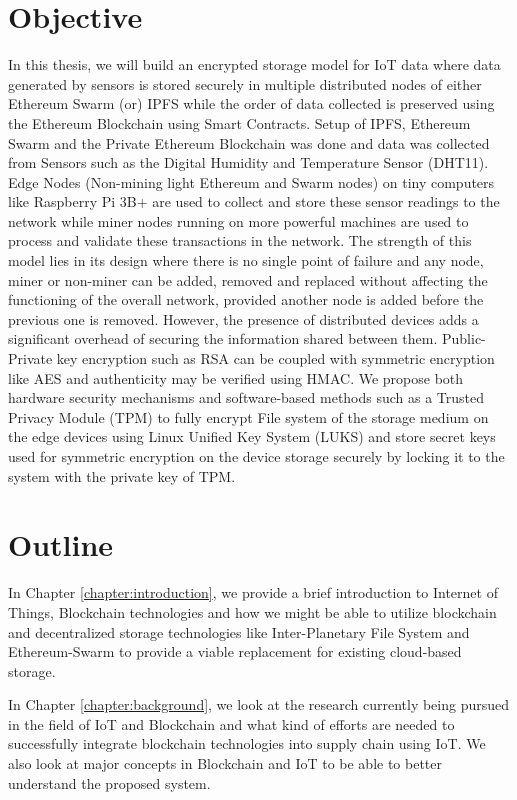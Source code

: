 \documentclass[11pt,openright]{report}
\begin{document}
\section{Objective}\label{section:objective}
In this thesis, we will build an encrypted storage model for IoT data where data generated by sensors is stored securely in multiple distributed nodes of either Ethereum Swarm (or) IPFS while the order of data collected is preserved using the Ethereum Blockchain using Smart Contracts. Setup of IPFS, Ethereum Swarm and the Private Ethereum Blockchain was done and data was collected from Sensors such as the Digital Humidity and Temperature Sensor (DHT11). Edge Nodes (Non-mining light Ethereum and Swarm nodes) on tiny computers like Raspberry Pi 3B+ are used to collect and store these sensor readings to the network while miner nodes running on more powerful machines are used to process and validate these transactions in the network. The strength of this model lies in its design where there is no single point of failure and any node, miner or non-miner can be added, removed and replaced without affecting the functioning of the overall  network, provided another node is added before the previous one is removed. However, the presence of distributed devices adds a significant overhead of securing the information shared between them. Public-Private key encryption such as RSA can be coupled with symmetric encryption like AES and authenticity may be verified using HMAC. We propose both hardware security mechanisms and software-based methods such as a Trusted Privacy Module (TPM) to fully encrypt File system of the storage medium on the edge devices using Linux Unified Key System (LUKS) and store secret keys used for symmetric encryption on the device storage securely by locking it to the system with the private key of TPM.

\section{Outline}\label{section:outline}

In Chapter \ref{chapter:introduction}, we provide a brief introduction to Internet of Things, Blockchain technologies and how we might be able to utilize blockchain and decentralized storage technologies like Inter-Planetary File System and Ethereum-Swarm to provide a viable replacement for existing cloud-based storage.\newline

\noindent In Chapter \ref{chapter:background}, we look at the research currently being pursued in the field of IoT and Blockchain and what kind of efforts are needed to successfully integrate blockchain technologies into supply chain using IoT. We also look at major concepts in Blockchain and IoT to be able to better understand the proposed system.\newline
\end{document}
